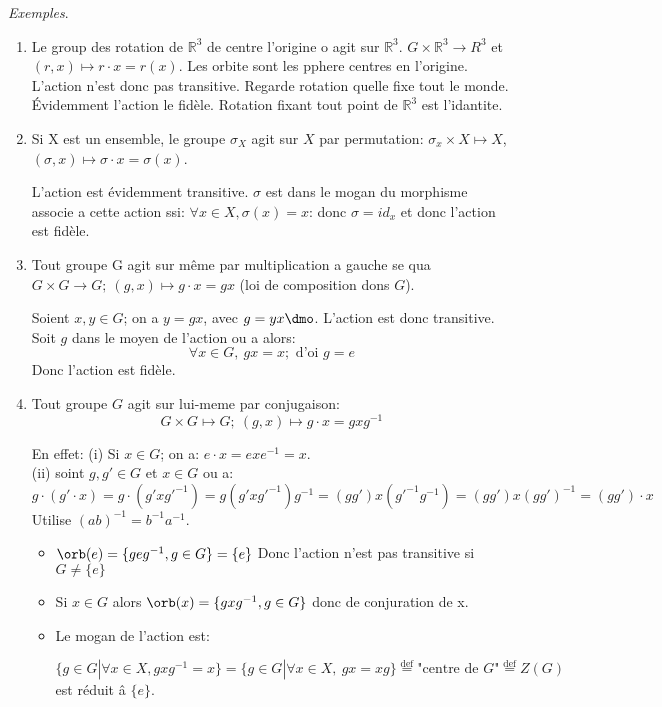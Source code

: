 \emph{Exemples}.
\begin{enumerate}
	\item Le group des rotation de $\mathbb{R}^3$ de centre l'origine o agit sur $\mathbb{R}^3$. $G\times\mathbb{R}^3\rightarrow{R}^3$ et $(r, x)\mapsto r\cdot x=r(x).$
	Les orbite sont les pphere centres en l'origine. L'action n'est donc pas transitive. Regarde rotation quelle fixe tout le monde. Évidemment l'action le fidèle. Rotation fixant tout point de $\mathbb{R}^3$ est l'idantite.
	\item Si X est un ensemble, le groupe $\sigma_X$ agit sur $X$ par permutation:
	$\sigma_x \times X\mapsto X$, $(\sigma, x)\mapsto \sigma\cdot x=\sigma(x)$.
	
	L'action est évidemment transitive. $\sigma$ est dans le mogan du morphisme associe a cette action ssi: $\forall x\in X, \sigma(x)=x$: donc $\sigma =id_x$ et donc l'action est fidèle.
	\item Tout groupe G agit sur même par multiplication a gauche se qua $G\times G \rightarrow G;\ (g,x)\mapsto g\cdot x=gx$ (loi de composition dons $G$).
	
	Soient $x, y\in G$; on a $y=gx$, avec $g=yx\dmo$. L'action est donc transitive.
	Soit $g$ dans le moyen de l'action ou a alors:
	$$\forall x\in G,\ gx=x; \mbox{ d'oi } g=e$$
	Donc l'action est fidèle.
	\item Tout groupe $G$ agit sur lui-meme par conjugaison:
	$$G\times G\mapsto G;\ (g,x)\mapsto g\cdot x=gxg^{-1}$$
	
	En effet: (i) Si $x\in G$; on a: $e\cdot x = exe^{-1} = x$.\\
	(ii)  soint $g, g'\in G$ et $x\in G$ ou a:
	$$g\cdot (g'\cdot x)=g\cdot (g'xg'^{-1})=g(g'xg'^{-1})g^{-1}=(gg')x(g'^{-1}g^{-1})=(gg')x(gg')^{-1}=(gg')\cdot x$$
	Utilise $(ab)^{-1}=b^{-1}a^{-1}$.
	\begin{itemize} 
	\item $\orb(e)=\{geg^{-1}, g\in G\}=\{e\}$ Donc l'action n'est pas transitive si $G\neq\{e\}$ \\%
	\item Si $x\in G$ alors $\orb(x)=\{gxg^{-1}, g\in G\}$ donc de conjuration de x.\\
	\item Le mogan de l'action est:	

	$$\{g\in G | \forall x\in X, gxg^{-1} = x\} = \{g\in G | \forall x \in X,\ gx=xg\}\overset{\text{def}}{=}\text{"centre de $G$"}\overset{\text{def}}{=} Z(G)$$
	est réduit â $\{e\}$.
	\end{itemize}
\end{enumerate}

